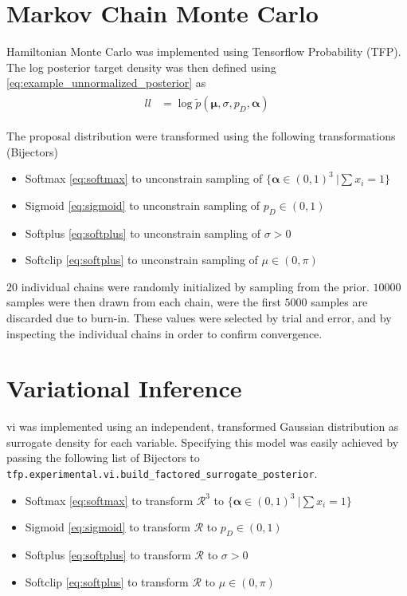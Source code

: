 \section{Markov Chain Monte Carlo}
Hamiltonian Monte Carlo was implemented using Tensorflow Probability (TFP). The log posterior target density was then defined using \cref{eq:example_unnormalized_posterior} as 
\begin{align}\label{eq:example_ll}
\begin{split}
    ll &= \log \tilde{p}(\boldsymbol{\mu}, \sigma, p_D, \boldsymbol{\alpha})
\end{split}
\end{align}


The proposal distribution were transformed using the following transformations (Bijectors)

\begin{itemize}
\item Softmax \eqref{eq:softmax} to unconstrain sampling of $\{\boldsymbol{\alpha} \in (0, 1)^3\ | \sum x_i = 1\}$
\item Sigmoid \eqref{eq:sigmoid} to unconstrain sampling of $p_D \in (0, 1)$
\item Softplus \eqref{eq:softplus} to unconstrain sampling of $\sigma > 0$
\item Softclip \eqref{eq:softplus} to unconstrain sampling of $\mu \in (0, \pi)$
\end{itemize}

$20$ individual chains were randomly initialized by sampling from the prior. $10000$ samples were then drawn from each chain, were the first $5000$ samples are discarded due to burn-in. These values were selected by trial and error, and by inspecting the individual chains in order to confirm convergence.  

\section{Variational Inference}

\acrshort{vi} was implemented using an independent, transformed Gaussian distribution as surrogate density for each variable. Specifying this model was easily achieved by passing the following list of Bijectors to \texttt{tfp.experimental.vi.build\_factored\_surrogate\_posterior}.
\begin{itemize}
\item Softmax \eqref{eq:softmax} to transform $\mathcal{R}^3$ to $\{\boldsymbol{\alpha} \in (0, 1)^3\ | \sum x_i = 1\}$
\item Sigmoid \eqref{eq:sigmoid} to transform $\mathcal{R}$ to $p_D \in (0, 1)$
\item Softplus \eqref{eq:softplus} to transform $\mathcal{R}$ to $\sigma > 0$
\item Softclip \eqref{eq:softplus} to transform $\mathcal{R}$ to $\mu \in (0, \pi)$
\end{itemize}

